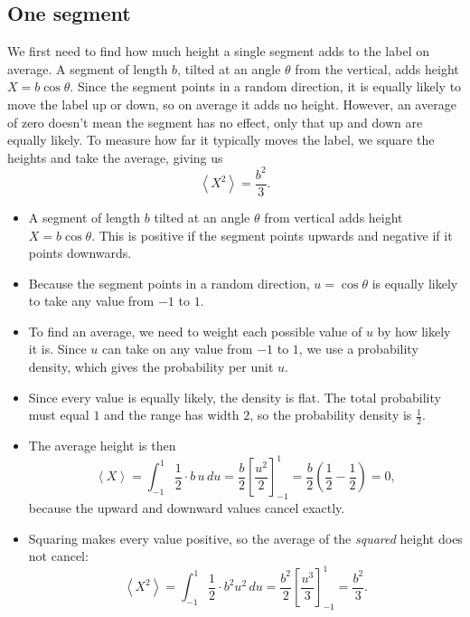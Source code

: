 \documentclass[10pt,a4paper]{article}
\numberwithin{equation}{section}
\newcommand{\avg}[1]{\left\langle #1\right\rangle}
\newcommand{\dropdown}{\par\medskip}
\begin{document}
\subsection*{One segment}
We first need to find how much height a single segment adds to the label on average. A segment of length $b$, tilted at an angle $\theta$ from the vertical, adds height $X = b\cos\theta$. Since the segment points in a random direction, it is equally likely to move the label up or down, so on average it adds no height. However, an average of zero doesn't mean the segment has no effect, only that up and down are equally likely. To measure how far it typically moves the label, we square the heights and take the average, giving us
\[
\avg{X^2} = \frac{b^2}{3}.
\]

\dropdown
\begin{itemize}
  \item A segment of length $b$ tilted at an angle $\theta$ from vertical adds height $X = b\cos\theta$. This is positive if the segment points upwards and negative if it points downwards.
  \item Because the segment points in a random direction, $u = \cos\theta$ is equally likely to take any value from $-1$ to $1$.
  \item To find an average, we need to weight each possible value of $u$ by how likely it is. Since $u$ can take on any value from $-1$ to $1$, we use a probability density, which gives the probability per unit $u$.
  \item Since every value is equally likely, the density is flat. The total probability must equal $1$ and the range has width $2$, so the probability density is $\tfrac12$.
  \item The average height is then
  \[
  \avg{X} = \int_{-1}^{1}\frac12\cdot b\,u\,du = \frac{b}{2}\left[\frac{u^2}{2}\right]_{-1}^{1} = \frac{b}{2}\left(\frac12 - \frac12\right) = 0,
  \]
  because the upward and downward values cancel exactly.
  \item Squaring makes every value positive, so the average of the \emph{squared} height does not cancel:
  \[
  \avg{X^2} = \int_{-1}^{1}\frac12\cdot b^2u^2\,du = \frac{b^2}{2}\left[\frac{u^3}{3}\right]_{-1}^{1} = \frac{b^2}{3}.
  \]
\end{itemize}
\end{document}
